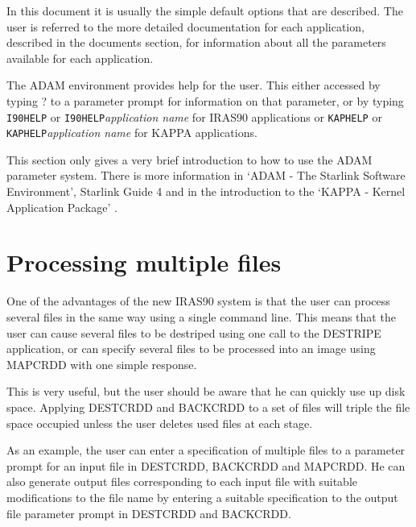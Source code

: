 In this document it is usually the simple default options that are described.
The user is referred to the more detailed documentation for each application,
described in the documents section, for information about all the parameters
available for each application.

The ADAM environment provides help for the user. This either accessed by typing
? to a parameter prompt for information on that parameter, or by typing
{\tt I90HELP} or {\tt I90HELP}{\it application name} for IRAS90 applications or 
{\tt KAPHELP} or {\tt KAPHELP}{\it application name} for KAPPA applications.

This section only gives a very brief introduction to how to use the ADAM
parameter system. There is more information in `ADAM - The Starlink Software
Environment', Starlink Guide 4 and in the introduction to the `KAPPA - Kernel
Application Package' 
.

\section{Processing multiple files
\label{m:promult}}

One of the advantages of the new IRAS90 system is that the user can process
several  files in the same way using a single command line. This means that
the user can cause several files to be destriped using one call to the DESTRIPE
application, or can specify several files to be processed into an image using
MAPCRDD with one simple response.

This is very useful, but the user should be aware that he can quickly use up
disk space. Applying DESTCRDD and BACKCRDD to a set of files will triple the
file space occupied unless the user deletes used files at each stage.

As an example, the user can enter a specification of multiple files to a
parameter prompt for an input file in DESTCRDD, BACKCRDD and MAPCRDD. He can
also generate output files corresponding to each input file with suitable
modifications to the file name by entering a suitable specification to the
output file parameter prompt in DESTCRDD and BACKCRDD.

